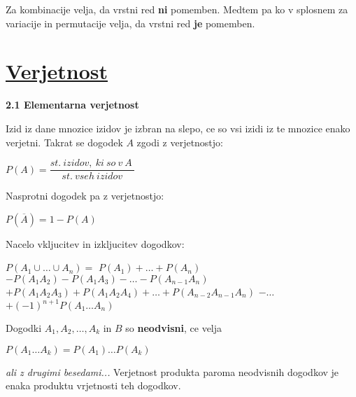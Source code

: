 \documentclass{article}
\begin{document}
\begin{multicols}{2}
\begin{small}
\begin{center}
		\end{center}

		Za kombinacije velja, da vrstni red \textbf{ni} pomemben. Medtem pa
		ko v splosnem za variacije in permutacije velja, da vrstni red \textbf{je}
		pomemben.
	\end{small}


	\section{\underline{Verjetnost}}


	\textbf{2.1 Elementarna verjetnost}
	\smallskip

	Izid iz dane mnozice izidov je izbran na slepo, ce so vsi izidi
	iz te mnozice enako verjetni. Takrat se dogodek $A$ zgodi z verjetnostjo:
	\begin{center}
		\begin{math}
			P(A) = \dfrac{st.\: izidov,\: ki\: so\: v\: A\:}{st.\: vseh\: izidov}
		\end{math}
	\end{center}
	Nasprotni dogodek pa z verjetnostjo:
	\begin{center}
		\begin{math}
			P(\overline{A}) = 1 - P(A)
		\end{math}
	\end{center}
	Nacelo vkljucitev in izkljucitev dogodkov:
	\begin{center}
		\begin{small}
			\begin{math}
				P(A_{1} \cup \dots \cup A_{n}) =
			\end{math}
			\begin{math}
				P(A_{1}) + \dots + P(A_{n})
			\end{math}
			\begin{math}
				- P(A_{1} A_{2}) - P(A_{1} A_{3}) - \dots - P(A_{n - 1} A_{n})
			\end{math}
			\begin{math}
				+ P(A_{1} A_{2} A_{3}) +P (A_{1} A_{2} A_{4}) + \dots + P(A_{n - 2} A_{n - 1} A_{n})
			\end{math}
			\begin{math}
				- \dots
			\end{math}
			\begin{math}
				+ (-1)^{n + 1} P(A_{1} \dots A_{n})
			\end{math}
		\end{small}
	\end{center}
	Dogodki $A_{1}, A_{2}, \dots , A_{k}$ in $B$ so \textbf{neodvisni}, ce velja
	\begin{center}
		\begin{math}
			P(A_{1} \dots A_{k}) = P(A_{1}) \dots P(A_{k})
		\end{math}
	\end{center}
	\textit{ali z drugimi besedami...} Verjetnost produkta paroma neodvisnih
	dogodkov je enaka produktu vrjetnosti teh dogodkov.


\end{multicols}
\end{document}
